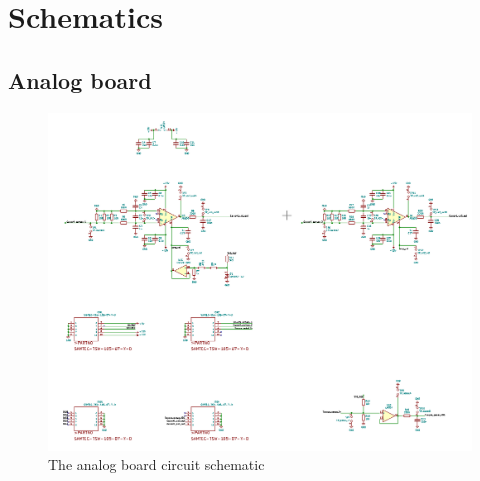 \section{Schematics}
\label{app:schematics}
\subsection{Analog board}


%   







\begin{figure} [H]
  \centering
  \includegraphics[width=\linewidth]{pictures/hardware/Analog_Interface_board/analog_schematic.png}
  \caption{The analog board circuit schematic}
  \label{fig:analog_schematic}
\end{figure}

